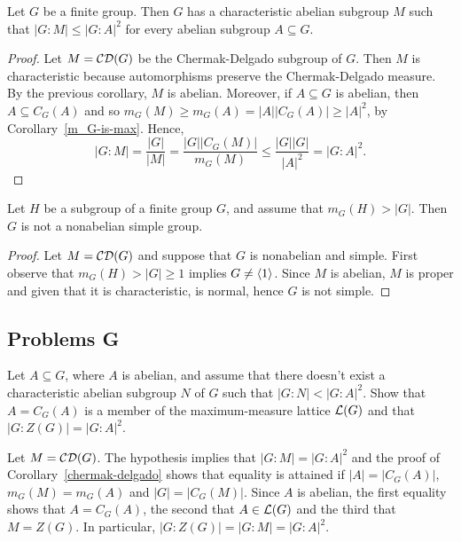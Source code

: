 \begin{cor}\label{chermak-delgado} {}
    Let\/ $G$ be a finite group. Then\/ $G$ has a characteristic abelian subgroup\/ $M$ such that\/ $|G:M| \le |G:A|^2$ for every abelian subgroup $A\subseteq G$.
\end{cor}

\begin{proof}
    Let $M=\operatorname{{\cal CD}}(G)$ be the Chermak-Delgado subgroup of $G$. Then $M$ is characteristic because automorphisms preserve the Chermak-Delgado measure. By the previous corollary, $M$ is abelian. Moreover, if $A\subseteq G$ is abelian, then $A\subseteq C_G(A)$ and so $m_G(M)\ge m_G(A)=|A||C_G(A)|\ge |A|^2$, by Corollary~\ref{m_G-is-max}. Hence,
    $$
        |G:M| = \frac{|G|}{|M|}=\frac{|G||C_G(M)|}{m_G(M)}
            \le\frac{|G||G|}{|A|^2} = |G:A|^2.
    $$
\end{proof}

\begin{cor}\label{not-nonabelian-simple}
    Let\/ $H$ be a subgroup of a finite group\/ $G$, and assume that\/ $m_G(H)>|G|$. Then\/ $G$ is not a nonabelian simple group.
\end{cor}

\begin{proof} Let $M=\operatorname{{\cal CD}}(G)$ and suppose that $G$ is nonabelian and simple. First observe that $m_G(H)>|G|\ge1$ implies $G\ne\langle1\rangle$. Since $M$ is abelian, $M$ is proper and given that it is characteristic, is normal, hence $G$ is not simple.  \end{proof}

\subsection{Problems G}

\begin{probl}\label{problem-1.G.1}
    Let\/ $A\subseteq G$, where\/ $A$ is abelian, and assume that there doesn't exist a characteristic abelian subgroup\/ $N$ of\/ $G$ such that\/ $|G:N| < |G:A|^2$. Show that\/ $A=C_G(A)$ is a member of the maximum-measure lattice ${\cal L}(G)$ and that\/ $|G:Z(G)| = |G:A|^2$.
\end{probl}

\begin{solution} Let $M=\operatorname{{\cal CD}}(G)$. The hypothesis implies that $|G:M|=|G:A|^2$ and the proof of Corollary~\ref{chermak-delgado} shows that equality is attained if $|A|=|C_G(A)|$, $m_G(M)=m_G(A)$ and $|G|=|C_G(M)|$. Since $A$ is abelian, the first equality shows that $A=C_G(A)$, the second that $A\in{\cal L}(G)$ and the third that $M=Z(G)$. In particular, $|G:Z(G)|=|G:M|=|G:A|^2$.  \end{solution}

